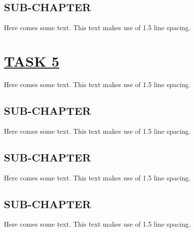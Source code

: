 \documentclass[fontsize=11pt]{scrartcl}
\begin{document}
\subsection{SUB-CHAPTER}
Here comes some text. This text makes use of 1.5 line spacing. 
\pagebreak
\section{\uline{TASK 5}}
Here comes some text. This text makes use of 1.5 line spacing. 
\subsection{SUB-CHAPTER}
Here comes some text. This text makes use of 1.5 line spacing. 
\subsection{SUB-CHAPTER}
Here comes some text. This text makes use of 1.5 line spacing. 
\subsection{SUB-CHAPTER}
Here comes some text. This text makes use of 1.5 line spacing. 
\pagebreak
\end{document}
